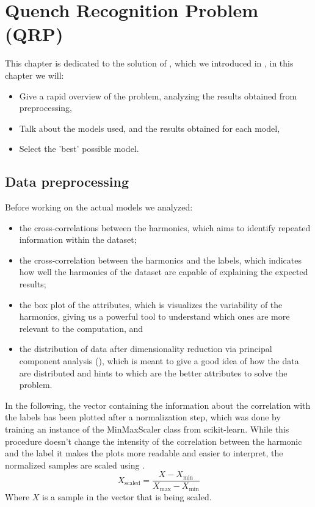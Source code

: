 \chapter{Quench Recognition Problem (QRP)}
\label{chp:qrp}
This chapter is dedicated to the solution of \qrp, which we introduced in , in this chapter we will:
\begin{itemize}
	\item Give a rapid overview of the problem, analyzing the results obtained from
	      preprocessing,
	\item Talk about the models used, and the results obtained for each model,
	\item Select the 'best' possible model.
\end{itemize}

\section{Data preprocessing}
\label{sec:qrp-preprocessing}
Before working on the actual models we analyzed:
\begin{itemize}
	\item the cross-correlations between the harmonics, which aims to identify repeated
	      information within the dataset;
	\item the cross-correlation between the harmonics and the labels, which indicates how
	      well the harmonics of the dataset are capable of explaining the expected results;
	\item the box plot of the attributes, which is visualizes the variability of the harmonics,
	      giving us a powerful tool to understand which ones are more relevant to the
	      computation, and
	\item the distribution of data after dimensionality reduction via principal component
	      analysis (\pca), which is meant to give a good idea of how the data are distributed
	      and hints to which are the better attributes to solve the problem.
\end{itemize}
In the following, the vector containing the information about the correlation with the labels has
been plotted after a normalization step, which was done by training an instance of the MinMaxScaler
class from scikit-learn. While this procedure doesn't change the intensity of the correlation
between the harmonic and the label it makes the plots more readable and easier to interpret, the normalized samples are scaled using  \cite{Nishok2024}.
\begin{equation}
	\label{eq:normalization}
	X_\text{scaled} = \frac{X - X_\text{min}}{X_\text{max} - X_\text{min}}
\end{equation}
Where $X$ is a sample in the vector that is being scaled.

